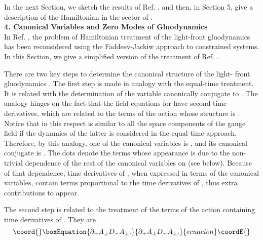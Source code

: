 \documentclass[a4paper,12pt]{article}
\begin{document}
In the next Section, we sketch the results of Ref. \cite{KMPV}, and then, 
in Section 5, 
give a description of the Hamiltonian in the sector of \coordHE{}.\\

{\bf 4. Canonical Variables and Zero Modes of \coordHE{} Gluodynamics }\\

In Ref. \cite{KMPV}, the problem of Hamiltonian treatment of the 
light-front gluodynamics has been reconsidered using 
the  Faddeev-Jackiw 
approach \cite{Jackiw} to constrained systems. In this Section, we 
give a simplified version of the treatment of Ref. \cite{KMPV}.

There are two key steps to determine the canonical 
structure of the light-
front gluodynamics \cite{KMPV}. The first step is made in analogy 
with the equal-time treatment. It is related with the determination 
of the variable canonically 
 conjugate to \coordHE{}. The analogy hinges on the fact that 
the field equations for 
\coordHE{} have second time derivatives, which are related to 
the terms of the action 
whose structure is \coordHE{}. 
Notice that in this respect \coordHE{} 
is similar to all the space components of the gauge field 
if the dynamics of the 
latter is considered in the equal-time approach. Therefore, 
by this analogy, one of 
the canonical variables is \coordHE{}, and its canonical conjugate is 
\coordHE{}. 
The dots denote the terms whose appearance is due to 
the non-trivial dependence of the rest of the canonical 
variables on \coordHE{} (see below). 
Because of that dependence, time derivatives of \coordHE{}, 
when expressed in terms of the 
canonical variables, contain terms proportional to 
the time derivatives of \coordHE{}, 
thus extra contributions to \coordHE{} appear.

The second step is related to the treatment of the terms 
of the action containing 
time derivatives of \coordHE{}. They are
\begin{equation}\coord{}\boxEquation{
\label{tdp}
\partial_+A_\perp D_-A_\perp.
}{
\partial_+A_\perp D_-A_\perp.
}{ecuacion}\coordE{}\end{equation}
\end{document}
